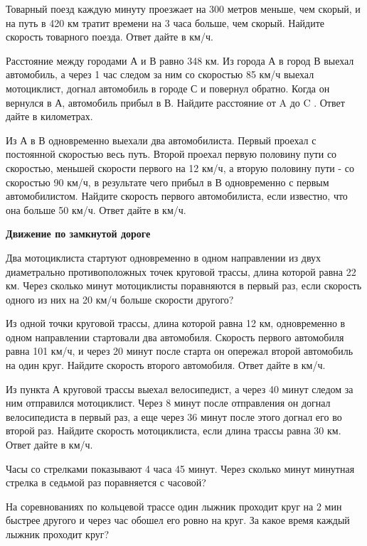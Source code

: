 \newpage
\hspace{3mm}

 Товарный поезд каждую минуту проезжает на 300 метров меньше, чем скорый, и на путь в 420 км тратит времени на 3 часа больше, чем скорый. Найдите скорость товарного поезда. Ответ дайте в км/ч.

 Расстояние между городами А и В равно 348 км. Из города А в город В выехал автомобиль, а через 1 час следом за ним со скоростью 85 км/ч выехал мотоциклист, догнал автомобиль в городе С и повернул обратно. Когда он вернулся в А, автомобиль прибыл в В. Найдите расстояние от A до C . Ответ дайте в километрах.

 Из А в В одновременно выехали два автомобилиста. Первый проехал с постоянной скоростью весь путь. Второй проехал первую половину пути со скоростью, меньшей скорости первого на 12 км/ч, а вторую половину пути - со скоростью 90 км/ч, в результате чего прибыл в В одновременно с первым автомобилистом. Найдите скорость первого автомобилиста, если известно, что она больше 50 км/ч. Ответ дайте в км/ч.


\centerline{\bf \Huge Движение по замкнутой дороге}


 Два мотоциклиста стартуют одновременно в одном направлении из двух диаметрально противоположных точек круговой трассы, длина которой равна 22 км. Через сколько минут мотоциклисты поравняются в первый раз, если скорость одного из них на 20 км/ч больше скорости другого?

 Из одной точки круговой трассы, длина которой равна 12 км, одновременно в одном направлении стартовали два автомобиля. Скорость первого автомобиля равна 101 км/ч, и через 20 минут после старта он опережал второй автомобиль на один круг. Найдите скорость второго автомобиля. Ответ дайте в км/ч.

 Из пункта А круговой трассы выехал велосипедист, а через 40 минут следом за ним отправился мотоциклист. Через 8 минут после отправления он догнал велосипедиста в первый раз, а еще через 36 минут после этого догнал его во второй раз. Найдите скорость мотоциклиста, если длина трассы равна 30 км. Ответ дайте в км/ч.

 Часы со стрелками показывают 4 часа 45 минут. Через сколько минут минутная стрелка в седьмой раз поравняется с часовой?

 На соревнованиях по кольцевой трассе один лыжник проходит круг на 2 мин быстрее другого и через час обошел его ровно на круг. За какое время каждый лыжник проходит круг?

